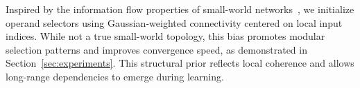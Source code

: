 Inspired by the information flow properties of small-world networks~\cite{watts1998collective, javaheripi2019swnet}, we initialize operand selectors using Gaussian-weighted connectivity centered on local input indices. While not a true small-world topology, this bias promotes modular selection patterns and improves convergence speed, as demonstrated in Section~\ref{sec:experiments}. This structural prior reflects local coherence and allows long-range dependencies to emerge during learning.
